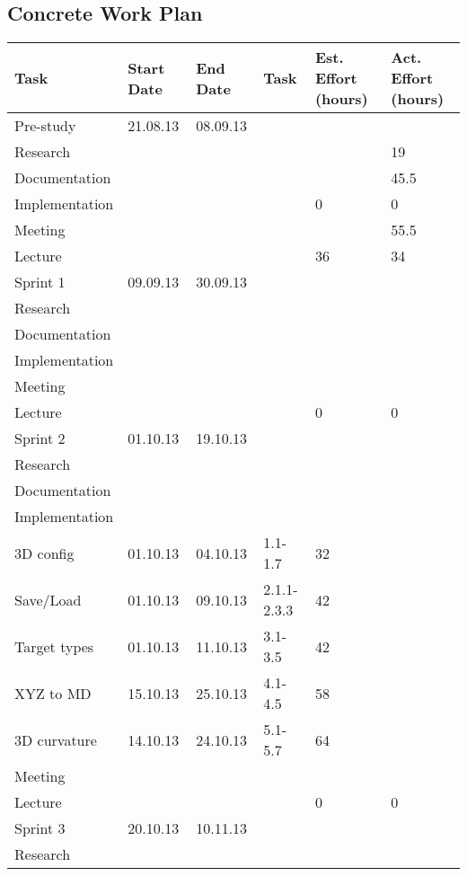 \documentclass{report}
\begin{document}
\subsection{Concrete Work Plan} \label{subsec:concrete_work_plan}
\begin{tabular}{| l | l | l | l | p{1.25 cm} | p{1.25 cm}|} \hline
Task & Start Date & End Date & Task & Est. Effort (hours) & Act. Effort (hours) \\ \hline
Pre-study & 21.08.13  & 08.09.13 &  &  &\\ \hline
Research &  &   &  &  & 19 \\ \hline
Documentation &  &   &  &  & 45.5 \\ \hline
Implementation &  &   &  &  0 & 0 \\ \hline
Meeting &  &   &  &   & 55.5 \\ \hline
Lecture &  &   &  &  36 & 34 \\ \hline
Sprint 1 & 09.09.13  & 30.09.13 &  &  &\\ \hline
Research &  &   &  &  &  \\ \hline
Documentation &  &   &  &  &  \\ \hline
Implementation &  &   &  &   &  \\ \hline
Meeting &  &   &  &   &  \\ \hline
Lecture &  &   &  &  0 & 0 \\ \hline
Sprint 2 & 01.10.13  & 19.10.13 &  &  &\\ \hline
Research &  &   &  &  &  \\ \hline
Documentation &  &   &  &  &  \\ \hline
Implementation &  &   &  &   &  \\ \hline
3D config & 01.10.13 & 04.10.13  & 1.1-1.7 & 32  &  \\ \hline
Save/Load & 01.10.13 & 09.10.13  & 2.1.1-2.3.3 & 42  &  \\ \hline
Target types & 01.10.13 & 11.10.13  & 3.1-3.5 & 42  &  \\ \hline
XYZ to MD & 15.10.13 & 25.10.13  & 4.1-4.5 & 58  &  \\ \hline
3D curvature & 14.10.13 & 24.10.13  & 5.1-5.7 & 64  &  \\ \hline
Meeting &  &   &  &   &  \\ \hline
Lecture &  &   &  &  0 & 0 \\ \hline
Sprint 3 & 20.10.13  & 10.11.13 &  &  &\\ \hline
Research &  &   &  &  &  \\ \hline

\end{tabular}
\end{document}
